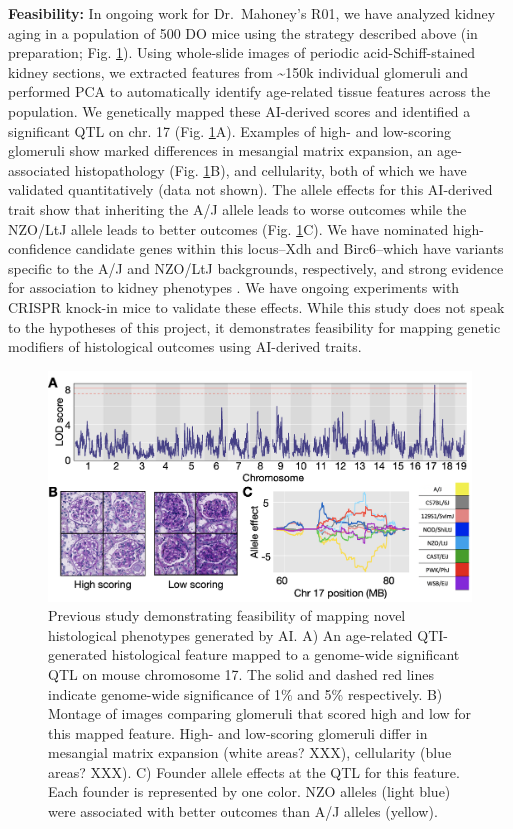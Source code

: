 \documentclass[
  12pt,
]{article}
\begin{document}
\textbf{Feasibility:} In ongoing work for Dr.~Mahoney's R01, we have
analyzed kidney aging in a population of 500 DO mice using the strategy
described above (in preparation; Fig. \ref{fig:histo}). Using
whole-slide images of periodic acid-Schiff-stained kidney sections, we
extracted features from \textasciitilde150k individual glomeruli and
performed PCA to automatically identify age-related tissue features
across the population. We genetically mapped these AI-derived scores and
identified a significant QTL on chr. 17 (Fig. \ref{fig:histo}A).
Examples of high- and low-scoring glomeruli show marked differences in
mesangial matrix expansion, an age-associated histopathology (Fig.
\ref{fig:histo}B), and cellularity, both of which we have validated
quantitatively (data not shown). The allele effects for this AI-derived
trait show that inheriting the A/J allele leads to worse outcomes while
the NZO/LtJ allele leads to better outcomes (Fig. \ref{fig:histo}C). We
have nominated high-confidence candidate genes within this locus--Xdh
and Birc6--which have variants specific to the A/J and NZO/LtJ
backgrounds, respectively, and strong evidence for association to kidney
phenotypes \cite{23249873, 29795190}. We have ongoing experiments with
CRISPR knock-in mice to validate these effects. While this study does
not speak to the hypotheses of this project, it demonstrates feasibility
for mapping genetic modifiers of histological outcomes using AI-derived
traits.

\begin{figure}[ht!]
\includegraphics[width=\textwidth]{Fig4.png} 
\caption{Previous study demonstrating feasibility of mapping novel histological phenotypes generated by AI. A) An age-related QTI-generated histological feature mapped to a genome-wide significant QTL on mouse chromosome 17. The solid and dashed red lines indicate genome-wide significance of 1\% and 5\% respectively. B) Montage of images comparing glomeruli that scored high and low for this mapped feature. High- and low-scoring glomeruli differ in mesangial matrix expansion (white areas? XXX), cellularity (blue areas? XXX). C) Founder allele effects at the QTL for this feature. Each founder is represented by one color. NZO alleles (light blue) were associated with better outcomes than A/J alleles (yellow).}
\label{fig:histo}
\end{figure}
\end{document}
